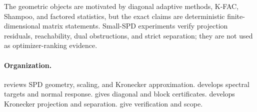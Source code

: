 The geometric objects are motivated by diagonal adaptive methods, K-FAC,
Shampoo, and factored statistics, but the exact claims are deterministic
finite-dimensional matrix statements.  Small-SPD experiments verify
projection residuals, reachability, dual obstructions, and strict separation;
they are not used as optimizer-ranking evidence.

\paragraph{Organization.}
 reviews SPD geometry, scaling, and Kronecker approximation.
 develops spectral targets and normal response.
 gives diagonal and block certificates.
 develops Kronecker projection and separation.
 give verification and scope.
